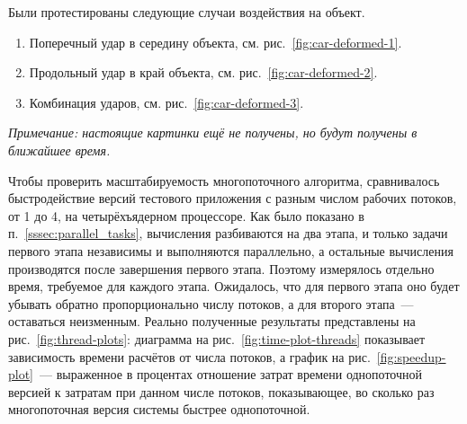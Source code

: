 \documentclass[a4paper, 14pt, titlepage]{extarticle}
\newcommand{\note}[1]{\textit{Примечание: #1}}
\begin{document}
        Были протестированы следующие случаи воздействия на объект.
        \begin{enumerate}
          \item Поперечный удар в середину объекта, см. рис.~\ref{fig:car-deformed-1}.
          \item Продольный удар в край объекта, см. рис.~\ref{fig:car-deformed-2}.
          \item Комбинация ударов, см. рис.~\ref{fig:car-deformed-3}.
        \end{enumerate}

        \note{настоящие картинки ещё не получены, но будут получены в ближайшее время.}

        Чтобы проверить масштабируемость многопоточного алгоритма, сравнивалось быстродействие
        версий тестового приложения с разным числом рабочих потоков, от 1 до 4, на четырёхъядерном
        процессоре. Как было показано в п.~\ref{sssec:parallel_tasks}, вычисления разбиваются на два
        этапа, и только задачи первого этапа независимы и выполняются параллельно, а остальные
        вычисления производятся после завершения первого этапа. Поэтому измерялось отдельно время,
        требуемое для каждого этапа. Ожидалось, что для первого этапа оно будет убывать обратно
        пропорционально числу потоков, а для второго этапа~--- оставаться неизменным. Реально
        полученные результаты представлены на рис.~\ref{fig:thread-plots}: диаграмма на
        рис.~\ref{fig:time-plot-threads} показывает зависимость времени расчётов от числа потоков, а
        график на рис.~\ref{fig:speedup-plot}~--- выраженное в процентах отношение затрат времени
        однопоточной версией к затратам при данном числе потоков, показывающее, во сколько раз
        многопоточная версия системы быстрее однопоточной.
\end{document}
